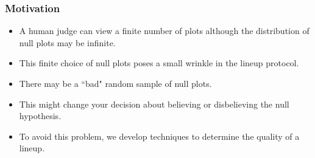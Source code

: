\documentclass{beamer}
\begin{document}
\begin{frame}
\frametitle{Motivation}
\begin{itemize}
\item A human judge can view a finite number of plots although the distribution of null plots may be infinite.
\item This finite choice of null plots poses a small wrinkle in the lineup protocol.
\item There may be a ``bad" random sample of null plots.
\item This might change your decision about believing or disbelieving the null hypothesis.
\item To avoid this problem, we develop techniques to determine the quality of a lineup.
\end{itemize}
\end{frame}
\end{document}
